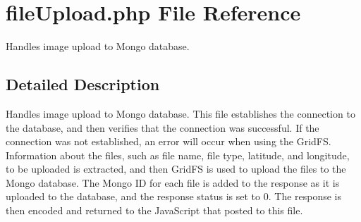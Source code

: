 \hypertarget{file_upload_8php}{\section{file\-Upload.\-php \-File \-Reference}
\label{file_upload_8php}
}


\-Handles image upload to \-Mongo database.  




\subsection{\-Detailed \-Description}
\-Handles image upload to \-Mongo database. \-This file establishes the connection to the database, and then verifies that the connection was successful. \-If the connection was not established, an error will occur when using the \-Grid\-F\-S. \-Information about the files, such as file name, file type, latitude, and longitude, to be uploaded is extracted, and then \-Grid\-F\-S is used to upload the files to the \-Mongo database. \-The \-Mongo \-I\-D for each file is added to the response as it is uploaded to the database, and the response status is set to 0. \-The response is then encoded and returned to the \-Java\-Script that posted to this file. 